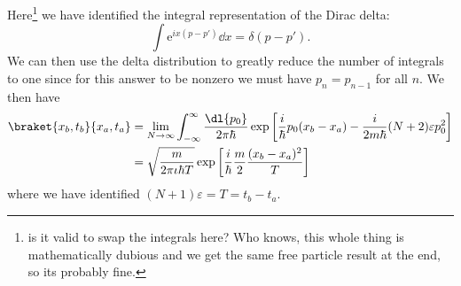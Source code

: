\documentclass[fleqn]{NotesClass}
\newcommand*{\e}{\mathrm{e}}
\begin{document}
    Here\footnote{is it valid to swap the integrals here? Who knows, this whole thing is mathematically dubious and we get the same free particle result at the end, so its probably fine.} we have identified the integral representation of the Dirac delta:
    \begin{equation}
        \int \e^{ix(p - p')} \dd{x} = \delta(p - p').
    \end{equation}
    We can then use the delta distribution to greatly reduce the number of integrals to one since for this answer to be nonzero we must have \(p_n = p_{n-1}\) for all \(n\).
    We then have
    \begin{align}
        \braket{x_b, t_b}{x_a, t_a} &= \lim_{N\to \infty} \int_{-\infty}^{\infty} \frac{\dl{p_0}}{2\pi\hbar} \exp\left[ \frac{i}{\hbar}p_0(x_b - x_a) - \frac{i}{2m\hbar}(N + 2)\varepsilon p_0^2 \right]\\
        &= \sqrt{\frac{m}{2\pi \iota\hbar T}} \exp\left[ \frac{i}{\hbar}\frac{m}{2}\frac{(x_b - x_a)^2}{T} \right]
    \end{align}
    where we have identified \((N + 1)\varepsilon = T = t_b - t_a\).
    
\end{document}
